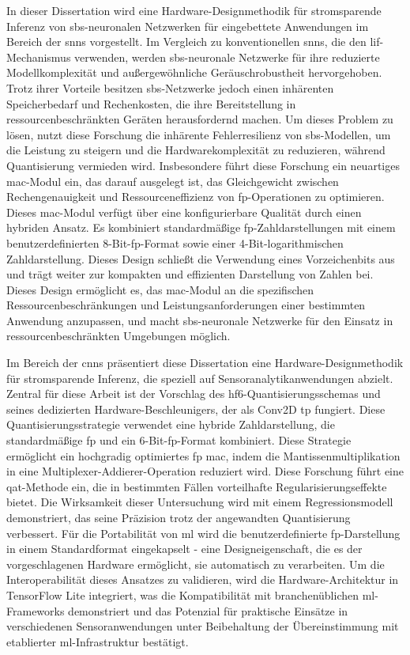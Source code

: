 \documentclass{article}
\begin{document}
In dieser Dissertation wird eine Hardware-Designmethodik f\"ur stromsparende Inferenz von \gls{sbs}-neuronalen Netzwerken f\"ur eingebettete Anwendungen im Bereich der \glspl{snn} vorgestellt. Im Vergleich zu konventionellen \glspl{snn}, die den \gls{lif}-Mechanismus verwenden, werden \gls{sbs}-neuronale Netzwerke f\"ur ihre reduzierte Modellkomplexit\"at und au\ss{}ergew\"ohnliche Ger\"auschrobustheit hervorgehoben. Trotz ihrer Vorteile besitzen \gls{sbs}-Netzwerke jedoch einen inh\"arenten Speicherbedarf und Rechenkosten, die ihre Bereitstellung in ressourcenbeschr\"ankten Ger\"aten herausfordernd machen. Um dieses Problem zu l\"osen, nutzt diese Forschung die inh\"arente Fehlerresilienz von \gls{sbs}-Modellen, um die Leistung zu steigern und die Hardwarekomplexit\"at zu reduzieren, w\"ahrend Quantisierung vermieden wird. Insbesondere f\"uhrt diese Forschung ein neuartiges \gls{mac}-Modul ein, das darauf ausgelegt ist, das Gleichgewicht zwischen Rechengenauigkeit und Ressourceneffizienz von \gls{fp}-Operationen zu optimieren. Dieses \gls{mac}-Modul verf\"ugt \"uber eine konfigurierbare Qualit\"at durch einen hybriden Ansatz. Es kombiniert standardm\"a\ss{}ige \gls{fp}-Zahldarstellungen mit einem benutzerdefinierten 8-Bit-\gls{fp}-Format sowie einer 4-Bit-logarithmischen Zahldarstellung. Dieses Design schlie\ss{}t die Verwendung eines Vorzeichenbits aus und tr\"agt weiter zur kompakten und effizienten Darstellung von Zahlen bei. Dieses Design erm\"oglicht es, das \gls{mac}-Modul an die spezifischen Ressourcenbeschr\"ankungen und Leistungsanforderungen einer bestimmten Anwendung anzupassen, und macht \gls{sbs}-neuronale Netzwerke f\"ur den Einsatz in ressourcenbeschr\"ankten Umgebungen m\"oglich.

Im Bereich der \glspl{cnn} pr\"asentiert diese Dissertation eine Hardware-Designmethodik f\"ur stromsparende Inferenz, die speziell auf Sensoranalytikanwendungen abzielt. Zentral f\"ur diese Arbeit ist der Vorschlag des \gls{hf6}-Quantisierungsschemas und seines dedizierten Hardware-Beschleunigers, der als Conv2D \gls{tp} fungiert. Diese Quantisierungsstrategie verwendet eine hybride Zahldarstellung, die standardm\"a\ss{}ige \gls{fp} und ein 6-Bit-\gls{fp}-Format kombiniert. Diese Strategie erm\"oglicht ein hochgradig optimiertes \gls{fp} \gls{mac}, indem die Mantissenmultiplikation in eine Multiplexer-Addierer-Operation reduziert wird. Diese Forschung f\"uhrt eine \gls{qat}-Methode ein, die in bestimmten F\"allen vorteilhafte Regularisierungseffekte bietet. Die Wirksamkeit dieser Untersuchung wird mit einem Regressionsmodell demonstriert, das seine Pr\"azision trotz der angewandten Quantisierung verbessert. F\"ur die Portabilit\"at von \gls{ml} wird die benutzerdefinierte \gls{fp}-Darstellung in einem Standardformat eingekapselt - eine Designeigenschaft, die es der vorgeschlagenen Hardware erm\"oglicht, sie automatisch zu verarbeiten. Um die Interoperabilit\"at dieses Ansatzes zu validieren, wird die Hardware-Architektur in TensorFlow Lite integriert, was die Kompatibilit\"at mit branchen\"ublichen \gls{ml}-Frameworks demonstriert und das Potenzial f\"ur praktische Eins\"atze in verschiedenen Sensoranwendungen unter Beibehaltung der \"Ubereinstimmung mit etablierter \gls{ml}-Infrastruktur best\"atigt.
\end{document}
